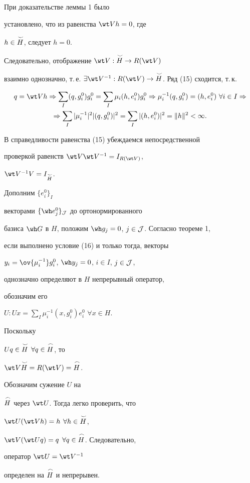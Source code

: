 \begin{pf} 


При доказательстве леммы 1 было 


установлено, что из равенства $\wt V h=0$, где 


$h\in\overset{\,\smile}{H}{}$, следует $h=0$. 


Следовательно, отображение $\wt V:\up{\smile}{H}\to R(\wt V)$ 


взаимно однозначно, т.\,е. $\exists \wt V^{-1}:R(\wt V) 


\to\up{\smile}{H}$. Ряд (15) сходится, т.\,к.


\begin{multline*} 


q=\wt V h\Rightarrow\sum_I(q,g^0_i)g^0_i=\sum_I 


\mu_i(h,e^0_i)g^0_i\Rightarrow 


\mu^{-1}_i(q,g^0_i)=(h,e^0_i)\ \forall i\in I \Rightarrow\\


\Rightarrow\sum_I 


|\mu^{-1}_i|^2|(q,g^0_i)|^2=\sum_I 


|(h,e^0_i)|^2=\|h\|^2<\infty. 


\end{multline*}  


В справедливости равенства (15) убеждаемся непосредственной 


проверкой равенств $\wt V\wt V^{-1}=I_{R(\wt V)}$, 


$\wt V^{-1}V=I_{\up{\smile}{H}}$. 


 


Дополним $\{e^0_i\}_I$


векторами $\{\wh e^0_j\}_{\cal J}$ до ортонормированного 


базиса $\wh G$ в $H$, положим $\wh g_j=0$, $j\in \cal J$. Согласно теореме 1,


если выполнено условие (16) и только тогда, векторы 


$y_i=\ov{\mu^{-1}_i}g^0_i$, $\wh y_j=0$, $i\in I$, $j\in \cal J$, 


однозначно определяют в $H$ непрерывный оператор, 


обозначим его 


$U:U x=\sum\limits_I\mu^{-1}_i(x,g^0_i)e^0_i$ $\forall x\in H$. 


Поскольку 


$U q\in\overset{\,\smile}{H}{}$ $\forall q\in \overset{\,\frown}{H}{}$, то 


$\wt V\up{\smile}{H}=R(\wt V)=\up{\frown}{H}$. 


Обозначим сужение $U$ на 


$\overset{\,\frown}{H}{}$ через $\wt U$. Тогда легко проверить, что 


$\wt U(\wt V h)=h$ $\forall h\in\overset{\,\smile}{H}{}$, 


$\wt V(\wt U q)=q$ $\forall q\in\overset{\,\frown}{H}{}$. Следовательно, 


оператор $\wt U=\wt V^{-1}$ 


определен на $\overset{\,\frown}{H}{}$ и непрерывен. 


\end{pf} 


